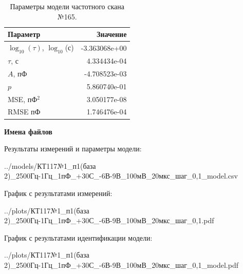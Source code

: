 \begin{table}[!ht]
    \centering
    \caption{Параметры модели частотного скана №165.}
    \begin{tabular}{|l|r|}
        \hline
        Параметр                                       & Значение                  \\ \hline
        $\log_{10}(\tau)$, $\log_{10}$(с)              & -3.363068e+00             \\ \hline
        $\tau$, с                                      & 4.334434e-04              \\ \hline
        $A$, пФ                                        & -4.708523e-03             \\ \hline
        $p$                                            & 5.860740e-01              \\ \hline
        MSE, пФ$^2$                                    & 3.050177e-08              \\ \hline
        RMSE пФ                                        & 1.746476e-04              \\ \hline
    \end{tabular}
    \label{table:frequency_scan_model_165}
\end{table}

\textbf{Имена файлов}

Результаты измерений и параметры модели:

\scriptsize../models/КТ117№1\_п1(база 2)\_2500Гц-1Гц\_1пФ\_+30С\_-6В-9В\_100мВ\_20мкс\_шаг\_0,1\_model.csv
\normalsize

График с результатами измерений:

\scriptsize../plots/КТ117№1\_п1(база 2)\_2500Гц-1Гц\_1пФ\_+30С\_-6В-9В\_100мВ\_20мкс\_шаг\_0,1.pdf
\normalsize

График с результатами идентификации модели:

\scriptsize../plots/КТ117№1\_п1(база 2)\_2500Гц-1Гц\_1пФ\_+30С\_-6В-9В\_100мВ\_20мкс\_шаг\_0,1\_model.pdf
\normalsize

